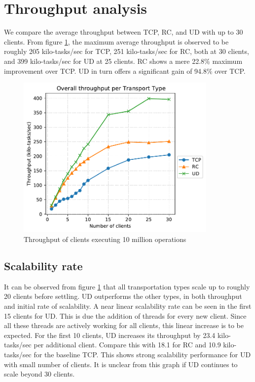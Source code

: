 \section{Throughput analysis}\label{sec:throughput-analysis}
We compare the average throughput between TCP, RC, and UD with up to 30 clients.
From figure \ref{fig:throughput-30}, the maximum average throughput is observed to be roughly 205 kilo-tasks/sec for TCP, 251 kilo-tasks/sec for RC, both at 30 clients, and 399 kilo-tasks/sec for UD at 25 clients.
RC shows a mere 22.8\% maximum improvement over TCP.
UD in turn offers a significant gain of 94.8\% over TCP.
\begin{figure}
    \centering
    \includegraphics[height=8cm]{figures/PDF/Throughput_30}
    \caption{Throughput of clients executing 10 million operations}
    \label{fig:throughput-30}
\end{figure}

\subsection{Scalability rate}\label{subsec:scalability-rate}
It can be observed from figure \ref{fig:throughput-30} that all transportation types scale up to roughly 20 clients before settling.
UD outperforms the other types, in both throughput and initial rate of scalability.
A near linear scalability rate can be seen in the first 15 clients for UD.
This is due the addition of threads for every new client.
Since all these threads are actively working for all clients, this linear increase is to be expected.
For the first 10 clients, UD increases its throughput by 23.4 kilo-tasks/sec per additional client.
Compare this with 18.1 for RC and 10.9 kilo-tasks/sec for the baseline TCP.
This shows strong scalability performance for UD with small number of clients.
It is unclear from this graph if UD continues to scale beyond 30 clients.


